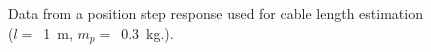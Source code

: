 
\begin{figure}
    \captionsetup[subfigure]{justification=centering}
    \centering
    \caption{ Data from a position step response used for cable length estimation 
    ($l =$~\SI{1}{\metre}, $m_p =$~\SI{0.3}{\kilo\gram}.).}
    \label{fig:FFT_pos_step_subfigs_prac}  
\end{figure}